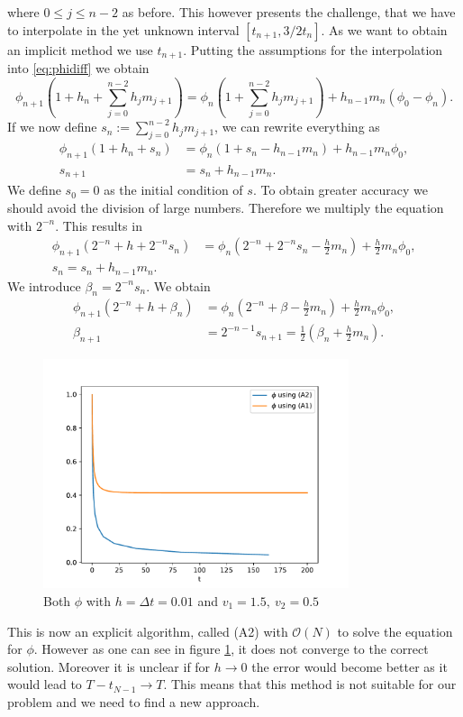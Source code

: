 \documentclass[12pt,a4paper,twoside, open=right]{scrreprt}
\theoremstyle{definition}
\theoremstyle{plain}
\begin{document}
where $0\le j\le n-2$ as before. This however presents the challenge, that we have to interpolate in the yet unknown interval $[t_{n+1},3/2t_{n}]$. As we want to obtain an implicit method we use $t_{n+1}$. Putting the assumptions for the interpolation into \eqref{eq:phidiff} we obtain
\begin{equation}
    \phi_{n+1}(1 + h_n + \sum_{j=0}^{n-2}h_jm_{j+1})=\phi_n(1+\sum_{j=0}^{n-2}h_jm_{j+1})+h_{n-1}m_n(\phi_0-\phi_n).
\end{equation}
If we now define $s_n:=\sum_{j=0}^{n-2}h_jm_{j+1}$, we can rewrite everything as
\begin{align}
    \phi_{n+1}(1+h_n+s_n)&=\phi_n(1+s_n-h_{n-1}m_n)+h_{n-1}m_n\phi_0,\\
    s_{n+1}&=s_n+h_{n-1}m_n.
\end{align}
We define $s_0=0$ as the initial condition of $s$. To obtain greater accuracy we should avoid the division of large numbers. Therefore we multiply the equation with $2^{-n}$. This results in
\begin{align}
    \phi_{n+1}(2^{-n}+h+2^{-n}s_n) &= \phi_n(2^{-n}+2^{-n}s_n-\frac{h}{2}m_n)+\frac{h}{2}m_n\phi_0,\\
    s_n=s_n+h_{n-1}m_n.
\end{align}
We introduce $\beta_n=2^{-n}s_n$. We obtain
\begin{align}
     \phi_{n+1}(2^{-n}+h+\beta_n) &= \phi_n(2^{-n}+\beta-\frac{h}{2}m_n)+\frac{h}{2}m_n\phi_0,\\
     \beta_{n+1} &= 2^{-n-1}s_{n+1}=\frac{1}{2}(\beta_n+\frac{h}{2}m_n) .
\end{align}

\begin{figure}
    \centering
    \includegraphics[width=0.8\textwidth]{Phidiff.pdf}
    \caption{Both $\phi$ with $h=\Delta t=0.01$ and $v_1=1.5,~v_2=0.5$}
    \label{fig:phifalse}
\end{figure}
This is now an explicit algorithm, called (A2) with $\mathcal{O}(N)$ to solve the equation for $\phi$. However as one can see in figure \ref{fig:phifalse}, it does not converge to the correct solution. Moreover it is unclear if for $h\to 0$ the error would become better as it would lead to $T-t_{N-1}\to T$. This means that this method is not suitable for our problem and we need to find a new approach.
\end{document}
